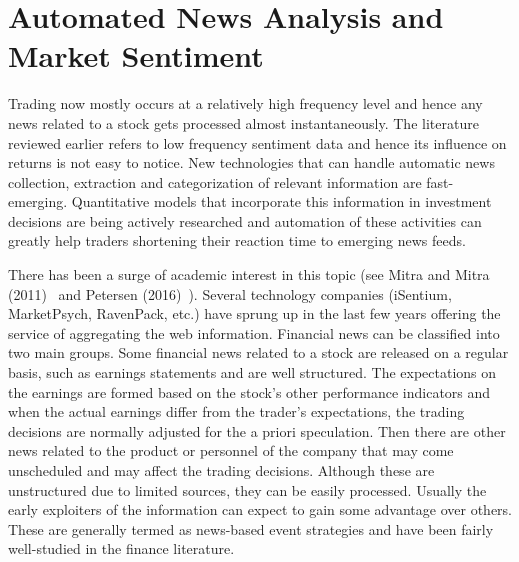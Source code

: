 \section{Automated News Analysis and Market Sentiment}


Trading now mostly occurs at a relatively high frequency level and hence any news related to a stock gets processed almost instantaneously. The literature reviewed earlier refers to low frequency sentiment data and hence its influence on returns is not easy to notice. New technologies that can handle automatic news collection, extraction and categorization of relevant information are fast-emerging. Quantitative models that incorporate this information in investment decisions are being actively researched and automation of these activities can greatly help traders shortening their reaction time to emerging news feeds.


There has been a surge of academic interest in this topic (see Mitra and Mitra (2011)~\cite{mitra2} and Petersen (2016)~\cite{peterson}). Several technology companies (iSentium, MarketPsych, RavenPack, etc.) have sprung up in the last few years offering the service of aggregating the web information. Financial news can be classified into two main groups. Some financial news related to a stock are released on a regular basis, such as earnings statements and are well structured. The expectations on the earnings are formed based on the stock's other performance indicators and when the actual earnings differ from the trader's expectations, the trading decisions are normally adjusted for the a priori speculation. Then there are other news related to the product or personnel of the company that may come unscheduled and may affect the trading decisions. Although these are unstructured due to limited sources, they can be easily processed. Usually the early exploiters of the information can expect to gain some advantage over others. These are generally termed as news-based event strategies and have been fairly well-studied in the finance literature. 


